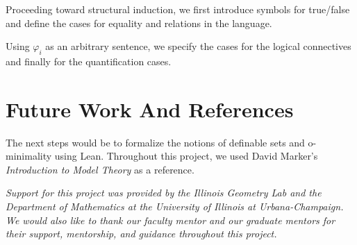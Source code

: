 \documentclass[landscape]{sciposter}
\begin{document}
\begin{multicols}{3}
Proceeding toward structural induction, we first introduce symbols for true/false and define the cases for equality and relations in the language.

Using $\varphi_i$ as an arbitrary sentence, we specify the cases for the logical connectives and finally for the quantification cases.

\section*{Future Work And References}

The next steps would be to formalize the notions of definable sets and o-minimality using Lean.
Throughout this project, we used David Marker's \emph{Introduction to Model Theory} as a reference.

\end{multicols}


\vfill
\centering
\emph{
Support for this project was provided by the Illinois Geometry Lab and the Department of Mathematics at the University of Illinois at Urbana-Champaign.\\ We would also like to thank our faculty mentor and our graduate mentors for their support, mentorship, and guidance throughout this project.}
\end{document}
